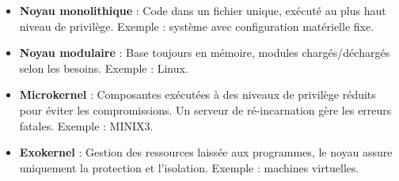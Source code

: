 \begin{itemize}
    \item \textbf{Noyau monolithique} : Code dans un fichier unique, exécuté au plus haut niveau de privilège. Exemple : système avec configuration matérielle fixe.
    \item \textbf{Noyau modulaire} : Base toujours en mémoire, modules chargés/déchargés selon les besoins. Exemple : Linux.
    \item \textbf{Microkernel} : Composantes exécutées à des niveaux de privilège réduits pour éviter les compromissions. Un serveur de ré-incarnation gère les erreurs fatales. Exemple : MINIX3.
    \item \textbf{Exokernel} : Gestion des ressources laissée aux programmes, le noyau assure uniquement la protection et l'isolation. Exemple : machines virtuelles.
\end{itemize}

